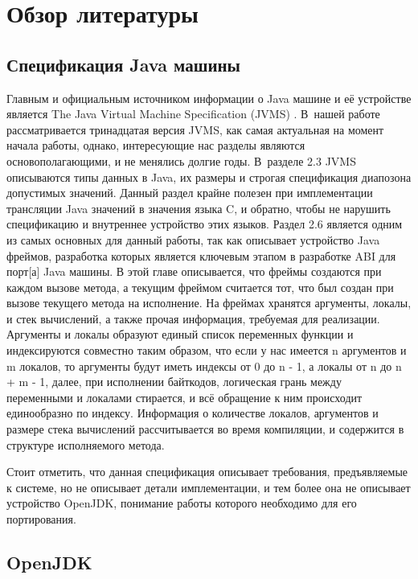 \section*{Обзор литературы}

\subsection*{Спецификация Java машины}

Главным и официальным источником информации о Java машине и её устройстве является The Java Virtual Machine Specification (JVMS) \cite{jvms}. В~нашей работе рассматривается тринадцатая версия JVMS, как самая актуальная на момент начала работы, однако, интересующие нас разделы являются основополагающими, и не менялись долгие годы. 
В~разделе 2.3 JVMS описываются типы данных в Java, их размеры и строгая спецификация диапозона допустимых значений. Данный раздел крайне полезен при имплементации трансляции Java значений в значения языка C, и обратно, чтобы не нарушить спецификацию и внутреннее устройство этих языков. Раздел 2.6 является одним из самых основных для данный работы, так как описывает устройство Java фреймов, разработка которых является ключевым этапом в разработке ABI для \gls{порт}[а] Java машины. В этой главе описывается, что фреймы создаются при каждом вызове метода, а текущим фреймом считается тот, что был создан при вызове текущего метода на исполнение. На фреймах хранятся аргументы, локалы, и стек вычислений, а также прочая информация, требуемая для реализации. Аргументы и локалы образуют единый список переменных функции и индексируются совместно таким образом, что если у нас имеется n аргументов и m локалов, то аргументы будут иметь индексы от 0 до n - 1, а локалы от n до n + m - 1, далее, при исполнении байткодов, логическая грань между переменными и локалами стирается, и всё обращение к ним происходит единообразно по индексу. Информация о количестве локалов, аргументов и размере стека вычислений рассчитывается во время компиляции, и содержится в структуре исполняемого метода.

Стоит отметить, что данная спецификация описывает требования, предъявляемые к системе, но не описывает детали имплементации, и тем более она не описывает устройство OpenJDK, понимание работы которого необходимо для его портирования.


\subsection*{OpenJDK}

